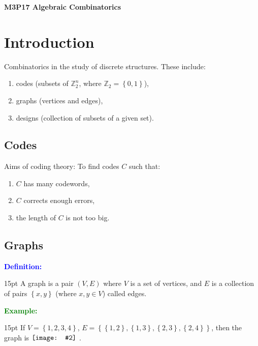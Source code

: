 \documentclass[12pt]{article}
\newcommand{\noparskip}{\vspace{-\parskip}}
\newenvironment{points}
	{\begin{enumerate}[label = (\arabic*)]}
	{\end{enumerate}}
\newenvironment{dent}
	{\begin{adjustwidth}{15pt}{}\noparskip}
	{\end{adjustwidth}}
\newenvironment{definition}
	{\textcolor{Blue}{\textbf{Definition:}}\begin{dent}}
	{\end{dent}}
\newenvironment{example}
	{\textcolor{Green}{\textbf{Example:}}\begin{dent}}
	{\end{dent}}
\newcommand{\pic}[2][1.0]{
	$\vcenter{\hbox{\texttt{[image: \#2]}\ }}$}
\newcommand{\set}[1]{\left\{ #1 \right\}}
\newcommand{\Z}{\mathbb{Z}}
\begin{document}
\pagestyle{empty}
\begin{center}
{\Large \textbf{M3P17 Algebraic Combinatorics}}
\end{center}
\renewcommand{\contentsname}{}
\vspace{-60pt}
\tableofcontents

\pagebreak

\pagestyle{fancy}
\setcounter{page}{1}
\setcounter{section}{-1}
\setcounter{secnumdepth}{1}
\subsectionfont{\underline}

\section{Introduction}

Combinatorics in the study of discrete structures. These include:
\noparskip
\begin{points}
\item codes (subsets of $\Z_2^n$, where $\Z_2 = \set{0, 1}$),
\item graphs (vertices and edges),
\item designs (collection of subsets of a given set).
\end{points}

\subsection{Codes}

Aims of coding theory: To find codes $C$ such that:
\noparskip
\begin{points}
\item $C$ has many codewords,
\item $C$ corrects enough errors,
\item the length of $C$ is not too big.
\end{points}

\subsection{Graphs}

\begin{definition}
A graph is a pair $(V, E)$ where $V$ is a set of vertices, and $E$ is a collection of pairs $\set{x, y}$ (where $x, y \in V$) called edges.
\end{definition}

\begin{example}
If $V = \set{1, 2, 3, 4}$, $E = \set{\set{1, 2}, \set{1, 3}, \set{2, 3}, \set{2, 4}}$, then the graph is \pic[0.3]{1.png}.
\end{example}
\end{document}
